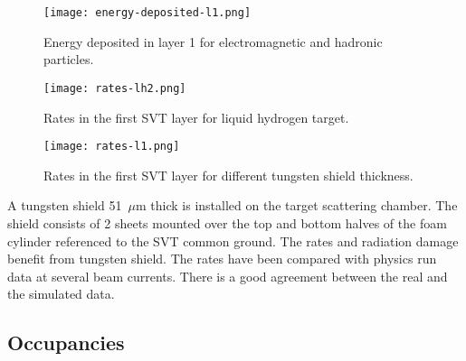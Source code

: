 \begin{wrapfigure}{l}{0.45\columnwidth}
\texttt{[image: energy-deposited-l1.png]}
\caption{Energy deposited in layer 1 for electromagnetic and hadronic particles.}
\label{fig:energy-deposited-l1}
\end{wrapfigure}

\begin{wrapfigure}{l}{0.45\columnwidth}
\texttt{[image: rates-lh2.png]}
\caption{Rates in the first SVT layer for liquid hydrogen target.}
\label{fig:rates-lh2}
\end{wrapfigure}

\begin{wrapfigure}{l}{0.45\columnwidth}
\texttt{[image: rates-l1.png]}
\caption{Rates in the first SVT layer for different tungsten shield thickness.}
\label{fig:rates-l1}
\end{wrapfigure}

A tungsten shield 51~$\mu$m thick is installed on the target scattering chamber. The shield consists of 2 sheets mounted over the top and bottom halves of the foam cylinder referenced to the SVT common ground. The rates and radiation damage benefit from tungsten shield. The rates have been compared with physics run data at several beam currents. There is a good agreement between the real and the simulated data.

\subsection{Occupancies}



